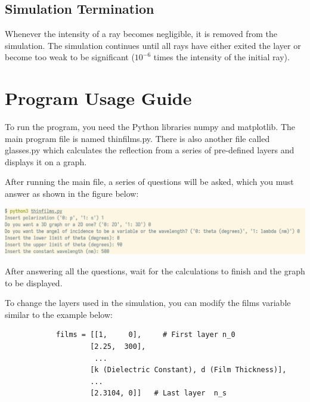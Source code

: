 \documentclass{article}
\begin{document}
	\subsection*{Simulation Termination}
		
		Whenever the intensity of a ray becomes negligible, it is removed from the simulation. The simulation continues until all rays have either exited the layer or become too weak to be significant ($10^{-6}$ times the intensity of the initial ray).
		
	\section*{Program Usage Guide}
		
		To run the program, you need the Python libraries numpy and matplotlib. The main program file is named thinfilms.py. There is also another file called glasses.py which calculates the reflection from a series of pre-defined layers and displays it on a graph.
		
		After running the main file, a series of questions will be asked, which you must answer as shown in the figure below:
		
	\begin{center}
		\includegraphics[height=0.15\linewidth]{questions.png}
	\end{center}
		
		After answering all the questions, wait for the calculations to finish and the graph to be displayed.
		
		To change the layers used in the simulation, you can modify the films variable similar to the example below:
		
		\begin{verbatim}
            films = [[1,     0],     # First layer n_0
                    [2.25,  300],
                     ...
                    [k (Dielectric Constant), d (Film Thickness)],
                    ...
                    [2.3104, 0]]   # Last layer  n_s            
		\end{verbatim}
	
	
	
	
	
	
	
	
	
\end{document}
